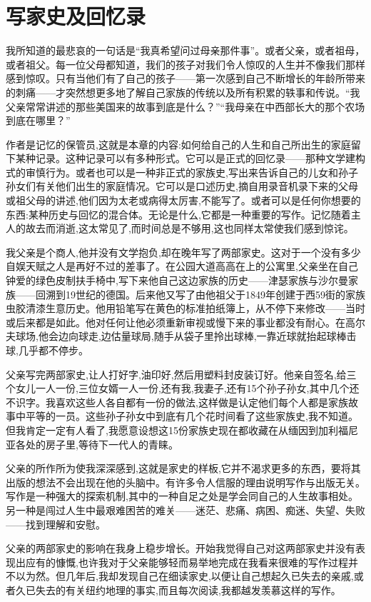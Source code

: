 \chapter{写家史及回忆录}
我所知道的最悲哀的一句话是“我真希望问过母亲那件事”。或者父亲，或者祖母，或者祖父。每一位父母都知道，我们的孩子对我们令人惊叹的人生并不像我们那样感到惊叹。只有当他们有了自己的孩子——第一次感到自己不断增长的年龄所带来的刺痛——才突然想更多地了解自己家族的传统以及所有积累的轶事和传说。“我父亲常常讲述的那些美国来的故事到底是什么？”“我母亲在中西部长大的那个农场到底在哪里？”

作者是记忆的保管员,这就是本章的内容:如何给自己的人生和自己所出生的家庭留下某种记录。这种记录可以有多种形式。它可以是正式的回忆录——那种文学建构式的审慎行为。或者也可以是一种非正式的家族史,写出来告诉自己的儿女和孙子孙女们有关他们出生的家庭情况。它可以是口述历史,摘自用录音机录下来的父母或祖父母的讲述,他们因为太老或病得太厉害,不能写了。或者可以是任何你想要的东西:某种历史与回忆的混合体。无论是什么,它都是一种重要的写作。记忆随着主人的故去而消逝,这太常见了,而时间总是不够用,这也同样太常使我们感到惊诧。

我父亲是个商人,他并没有文学抱负,却在晚年写了两部家史。这对于一个没有多少自娱天赋之人是再好不过的差事了。在公园大道高高在上的公寓里,父亲坐在自己钟爱的绿色皮制扶手椅中,写下来他自己这边家族的历史——津瑟家族与沙尔曼家族——回溯到19世纪的德国。后来他又写了由他祖父于1849年创建于西59街的家族虫胶清漆生意历史。他用铅笔写在黄色的标准拍纸簿上，从不停下来修改——当时或后来都是如此。他对任何让他必须重新审视或慢下来的事业都没有耐心。在高尔夫球场,他会边向球走,边估量球局,随手从袋子里拎出球棒,一靠近球就抬起球棒击球,几乎都不停步。

父亲写完两部家史,让人打好字,油印好,然后用塑料封皮装订好。他亲自签名,给三个女儿一人一份,三位女婿一人一份,还有我,我妻子,还有15个孙子孙女,其中几个还不识字。我喜欢这些人各自都有一份的做法,这样做是认定他们每个人都是家族故事中平等的一员。这些孙子孙女中到底有几个花时间看了这些家族史,我不知道。但我肯定一定有人看了,我愿意设想这15份家族史现在都收藏在从缅因到加利福尼亚各处的房子里,等待下一代人的青睐。

父亲的所作所为使我深深感到,这就是家史的样板,它并不渴求更多的东西，要将其出版的想法不会出现在他的头脑中。有许多令人信服的理由说明写作与出版无关。写作是一种强大的探索机制,其中的一种自足之处是学会同自己的人生故事相处。另一种是闯过人生中最艰难困苦的难关——迷茫、悲痛、病困、痴迷、失望、失败——找到理解和安慰。

父亲的两部家史的影响在我身上稳步增长。开始我觉得自己对这两部家史并没有表现出应有的慷慨,也许我对于父亲能够轻而易举地完成在我看来很难的写作过程并不以为然。但几年后,我却发现自己在细读家史,以便让自己想起久已失去的亲戚,或者久已失去的有关纽约地理的事实,而且每次阅读,我都越发羡慕这样的写作。

